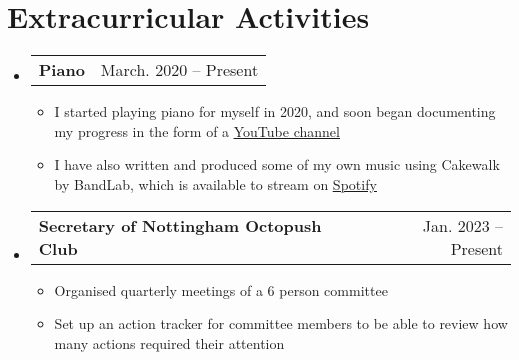 \documentclass[letterpaper,11pt]{article}
\makeatletter
\newcommand{\resumeItem}[1]{
  \item\small{
    {#1 \vspace{-2pt}}
  }
}
\newcommand{\resumeProjectHeading}[2]{
    \item
    \begin{tabular*}{0.97\textwidth}{l@{\extracolsep{\fill}}r}
      \small#1 & #2 \\
    \end{tabular*}\vspace{-7pt}
}
\newcommand{\resumeSubHeadingListStart}{\begin{itemize}[leftmargin=0.15in, label={}]}
\newcommand{\resumeSubHeadingListEnd}{\end{itemize}}
\newcommand{\resumeItemListStart}{\begin{itemize}}
\newcommand{\resumeItemListEnd}{\end{itemize}\vspace{-5pt}}
\makeatother
\begin{document}


\section{Extracurricular Activities}
 \resumeSubHeadingListStart
  \resumeProjectHeading
   {\textbf{Piano} }{March. 2020 -- Present}
  \resumeItemListStart
    \resumeItem{I started playing piano for myself in 2020, and soon began documenting my progress in the form of a \href{https://www.youtube.com/@olisharppiano}{\underline{YouTube channel}}}
    \resumeItem{I have also written and produced some of my own music using Cakewalk by BandLab, which is available to stream on \href{https://open.spotify.com/artist/6LruVw10BsMoQSLqjqANQI?si=QLf49HMaT3a0i50DmHI0gQ}{\underline{Spotify}}}
  \resumeItemListEnd
  \resumeProjectHeading
    {\textbf{Secretary of Nottingham Octopush Club}}{Jan. 2023 -- Present}
    \resumeItemListStart
        \resumeItem{Organised quarterly meetings of a 6 person committee}
        \resumeItem{Set up an action tracker for committee members to be able to review how many actions required their attention}
    \resumeItemListEnd
 \resumeSubHeadingListEnd


\end{document}
